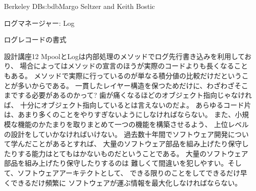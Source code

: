\begin{aosachapter}{Berkeley DB}{s:bdb}{Margo Seltzer and Keith Bostic}
\begin{aosasect1}{ログマネージャー: Log}
\begin{aosasect2}{ログレコードの書式}
\begin{aosabox}{設計講座12}
MpoolとLogは内部処理のメソッドでログ先行書き込みを利用しており、
場合によってはメソッドの宣言のほうが実際のコードよりも長くなることもある。
メソッドで実際に行っているのが単なる積分値の比較だけだということが多いからである。
一貫したレイヤー構造を保つためだけに、わざわざそこまでする必要があるのかって?
歯が痛くなるほどのオブジェクト指向じゃなければ、
十分にオブジェクト指向しているとは言えないのだよ。
あらゆるコード片は、あまり多くのことをやりすぎないようにしなければならない。
また、小規模な機能のかたまりを取りまとめて一つの機能を構築させるよう、
上位レベルの設計をしていかなければいけない。
過去数十年間でソフトウェア開発について学んだことがあるとすれば、
大量のソフトウェア部品を組み上げたり保守したりする能力はとてもはかないものだということである。
大量のソフトウェア部品を組み上げたり保守したりするのは
難しくて間違いを犯しやすい。そして、ソフトウェアアーキテクトとして、
できる限りのことをしてできるだけ早くできるだけ頻繁に
ソフトウェアが運ぶ情報を最大化しなければならない。

\end{aosabox}


\end{aosasect2}
\end{aosasect1}
\end{aosachapter}
